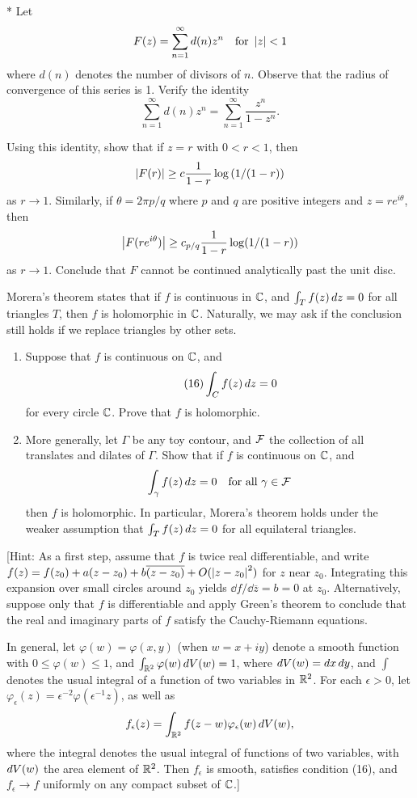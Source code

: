 \begin{exercise}
* Let $$F(z)=\sum_{n=1}^\infty d(n)z^n \quad\text{for }\left\lvert z \right\rvert<1$$ where $d(n)$ denotes the number of divisors of $n$. Observe that the radius of convergence of this series is 1. Verify the identity $$\sum_{n=1}^\infty d(n)z^n = \sum_{n=1}^\infty \frac{z^n}{1-z^n}.$$ 

Using this identity, show that if $z = r$ with $0 <r< 1$, then $$\left\lvert F(r) \right\rvert\geq c\frac{1}{1-r}\log{(1/(1-r))}$$ as $r\to1$. Similarly, if $\theta = 2\pi p/q$ where $p$ and $q$ are positive integers and $z = re^{i\theta}$, then $$\left\lvert F(re^{i\theta}) \right\rvert\geq c_{p/q} \frac{1}{1-r}\log(1/(1-r))$$ as $r\to1$. Conclude that $F$ cannot be continued analytically past the unit disc.
\end{exercise}

\begin{exercise}
Morera's theorem states that if $f$ is continuous in $\mathbb{C}$, and $\int_T f(z)\mathop{d{z}}=0$ for all triangles $T$, then $f$ is holomorphic in $\mathbb{C}$. Naturally, we may ask if the conclusion still holds if we replace triangles by other sets.
\begin{enumerate}[label=(\alph*)]
\item Suppose that $f$ is continuous on $\mathbb{C}$, and \begin{equation}\tag{16}\int_C f(z)\mathop{d{z}}=0\end{equation} for every circle $\mathbb{C}$. Prove that $f$ is holomorphic.
\item More generally, let $\Gamma$ be any toy contour, and $\mathcal{F}$ the collection of all translates and dilates of $\Gamma$. Show that if $f$ is continuous on $\mathbb{C}$, and $$\int_\gamma f(z)\mathop{d{z}}=0\quad\text{for all }\gamma\in\mathcal{F}$$ then $f$ is holomorphic. In particular, Morera's theorem holds under the weaker assumption that $\int_Tf(z)\mathop{d{z}}=0$ for all equilateral triangles.
\end{enumerate}
[Hint: As a first step, assume that $f$ is twice real differentiable, and write $f(z)=f(z_0)+a(z-z_0)+b\overline{(z-z_0)}+O(\left\lvert z - z_0 \right\rvert^2)$ for $z$ near $z_0$. Integrating this expansion over small circles around $z_0$ yields $\dd{f}/\dd{\overline{z}}=b=0$ at $z_0$. Alternatively, suppose only that $f$ is differentiable and apply Green's theorem to conclude that the real and imaginary parts of $f$ satisfy the Cauchy-Riemann equations.

In general, let $\varphi(w) = \varphi(x, y)$ (when $w = x + iy$) denote a smooth function with
$0 \leq \varphi(w) \leq 1$, and $\int_{\mathbb{R}^2}\varphi(w)\mathop{d{V(w)}}=1$, where $\mathop{d{V(w)}} = \mathop{d{x}}\mathop{d{y}}$, and $\int$ denotes the usual integral of a function of two variables in $\mathbb{R}^2$. For each $\epsilon>0$, let $\varphi_\epsilon(z)=\epsilon^{-2}\varphi(\epsilon^{-1}z)$, as well as $$f_\epsilon(z)=\int_{\mathbb{R}^2} f(z-w)\varphi_\epsilon(w)\mathop{d{V(w)}},$$ where the integral denotes the usual integral of functions of two variables, with $\mathop{d{V(w)}}$ the area element of $\mathbb{R}^2$. Then $f_\epsilon$ is smooth, satisfies condition (16), and
$f_\epsilon\to f$ uniformly on any compact subset of $\mathbb{C}$.]
\end{exercise}

